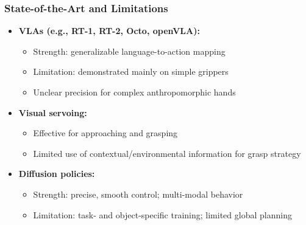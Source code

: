 \documentclass{beamer}
\begin{document}
\begin{frame}
  \frametitle{State-of-the-Art and Limitations}
  \small
  \begin{itemize}
    \item \textbf{VLAs (e.g., RT-1, RT-2, Octo, openVLA):}
      \begin{itemize}
        \item Strength: generalizable language-to-action mapping
        \item Limitation: demonstrated mainly on simple grippers
        \item Unclear precision for complex anthropomorphic hands
      \end{itemize}
    \item \textbf{Visual servoing:}
      \begin{itemize}
        \item Effective for approaching and grasping
        \item Limited use of contextual/environmental information for grasp strategy
      \end{itemize}
    \item \textbf{Diffusion policies:}
      \begin{itemize}
        \item Strength: precise, smooth control; multi-modal behavior
        \item Limitation: task- and object-specific training; limited global planning
      \end{itemize}
  \end{itemize}
\end{frame}
\end{document}
